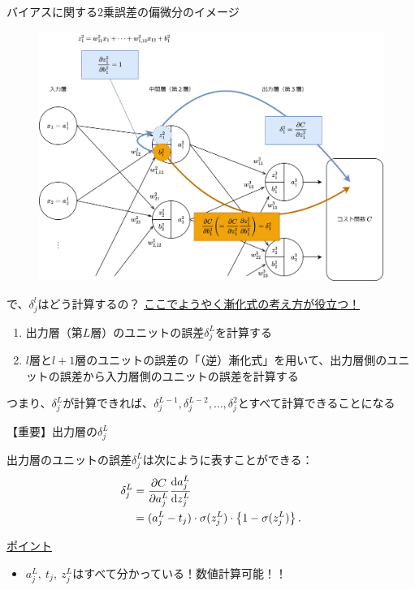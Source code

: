 \documentclass[dvipdfmx,aspectratio=169]{beamer}
\begin{document}
	\begin{frame}{バイアスに関する2乗誤差の偏微分のイメージ}
		\begin{figure}
			\centering
			\includegraphics[width=0.7\linewidth]{img/image-of-the-partial-derivative-of-the-squared-error-with-respect-to-the-bias}
		\end{figure}
	\end{frame}
	\begin{frame}{で、$ \delta^l_j $はどう計算するの？}
		\underline{ここでようやく\alert{漸化式}の考え方が役立つ！}
		\begin{enumerate}
			\item 出力層（第$ L $層）のユニットの誤差$ \delta^L_j $を計算する
			\item $ l $層と$ l+1 $層のユニットの誤差の「（逆）漸化式」を用いて、出力層側のユニットの誤差から入力層側のユニットの誤差を計算する
		\end{enumerate}
		つまり、$ \delta^L_j $が計算できれば、$ \delta^{L-1}_j, \delta^{L-2}_j,\dots, \delta^2_j $とすべて計算できることになる
	\end{frame}
	\begin{frame}{【重要】出力層の$ \delta^L_j $}
		\begin{screen}
			出力層のユニットの誤差$ \delta^L_j $は次にように表すことができる：
			\begin{align}\label{eq:output-layer-unit-error}
				\delta^L_j 	&= \dfrac{\partial C}{\partial a^L_j} \dfrac{\mathrm{d} a^L_j}{\mathrm{d}z^L_j}\notag\\
							&= (a^L_j - t_j)\cdot\sigma(z^L_j)\cdot\left\lbrace1 - \sigma(z^L_j)\right\rbrace.
			\end{align}
		\end{screen}
		\underline{ポイント}
		\begin{itemize}
			\item $ a^L_j,\ t_j,\ z^L_j $はすべて分かっている！数値計算可能！！
		\end{itemize}
	\end{frame}
\end{document}
